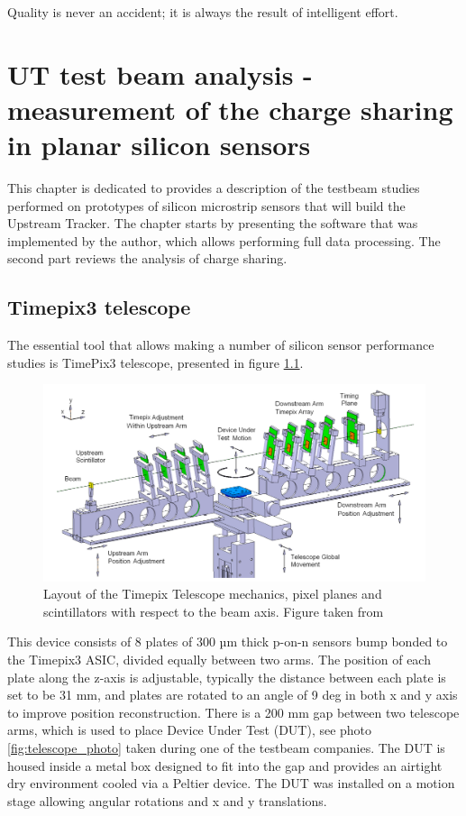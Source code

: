 \begin{savequote}[75mm] 
Quality is never an accident; it is always the result of intelligent effort. 
\end{savequote}


\chapter{UT test beam analysis - measurement of the charge sharing
in planar silicon sensors}
\label{chapter:testbeam}

This chapter is dedicated to provides a description of the testbeam studies performed on prototypes of silicon microstrip sensors that will build the Upstream Tracker. The chapter starts by presenting the software that was implemented by the author, which allows performing full data processing. The second part reviews the analysis of charge sharing. 





\section{Timepix3 telescope}
The essential tool that allows making a number of silicon sensor performance studies is TimePix3 telescope, presented in figure \ref{fig:telescope}. 


\begin{figure}[!h]
\centering
\includegraphics{figures/telescope.png}
\caption{Layout of the Timepix Telescope mechanics, pixel planes and scintillators with respect to the beam axis. Figure taken from \cite{telescope}}
\label{fig:telescope}
\end{figure}


This device consists of 8 plates of 300 µm thick p-on-n sensors bump bonded to the Timepix3 ASIC, divided equally between two arms. The position of each plate along the z-axis is adjustable, typically the distance between each plate is set to be 31 mm, and plates are rotated to an angle of 9 deg in both x and y axis to improve position reconstruction. There is a 200 mm gap between two telescope arms, which is used to place Device Under Test (DUT), see photo \ref{fig:telescope_photo} taken during one of the testbeam companies. The DUT is housed inside a metal box designed to fit into the gap and provides an airtight dry environment cooled via a Peltier device. 
The DUT was installed on a motion stage allowing angular rotations and x and y translations. 


